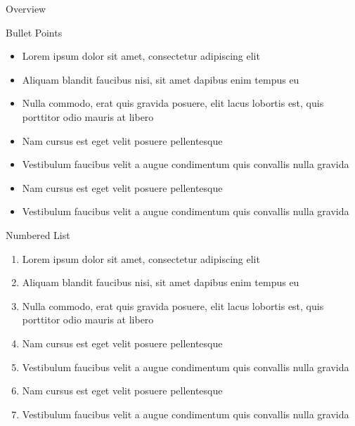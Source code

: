 \documentclass[aspectratio=169,xcolor=dvipsnames, t]{beamer}
\date{\today} %
\begin{document}
    \maketitlepage
    \begin{frame}[t]{Overview}
        \tableofcontents 
    \end{frame}

    \begin{frame}{Bullet Points}
        \begin{itemize}
            \item Lorem ipsum dolor sit amet, consectetur adipiscing elit
            \item Aliquam blandit faucibus nisi, sit amet dapibus enim tempus eu
            \item Nulla commodo, erat quis gravida posuere, elit lacus lobortis est, quis porttitor odio mauris at libero
            \item Nam cursus est eget velit posuere pellentesque
            \item Vestibulum faucibus velit a augue condimentum quis convallis nulla gravida
            \item Nam cursus est eget velit posuere pellentesque
            \item Vestibulum faucibus velit a augue condimentum quis convallis nulla gravida
        \end{itemize}
    \end{frame}

    \begin{frame}{Numbered List}
        \begin{enumerate}
            \item Lorem ipsum dolor sit amet, consectetur adipiscing elit
            \item Aliquam blandit faucibus nisi, sit amet dapibus enim tempus eu
            \item Nulla commodo, erat quis gravida posuere, elit lacus lobortis est, quis porttitor odio mauris at libero
            \item Nam cursus est eget velit posuere pellentesque
            \item Vestibulum faucibus velit a augue condimentum quis convallis nulla gravida
            \item Nam cursus est eget velit posuere pellentesque
            \item Vestibulum faucibus velit a augue condimentum quis convallis nulla gravida
        \end{enumerate}
    \end{frame}
\end{document}
